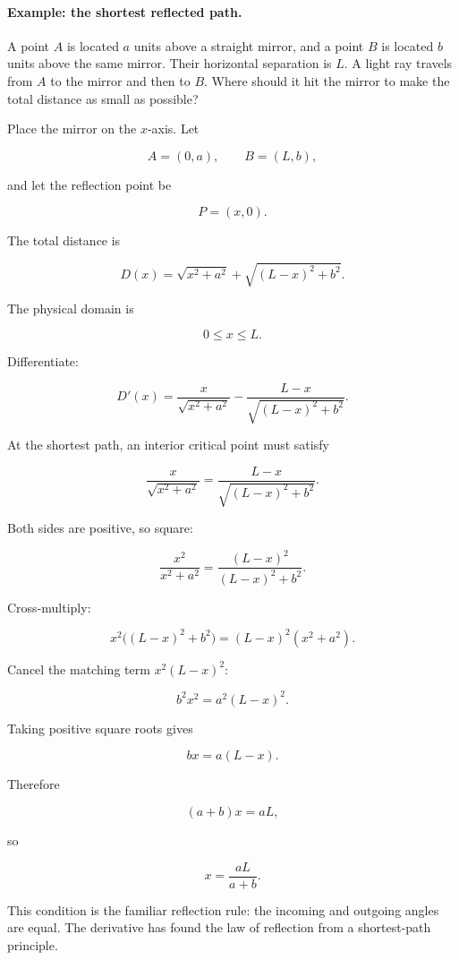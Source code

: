 \paragraph{Example: the shortest reflected path.}
A point \(A\) is located \(a\) units above a straight mirror, and a point \(B\) is located
\(b\) units above the same mirror.  Their horizontal separation is \(L\).  A light ray travels
from \(A\) to the mirror and then to \(B\).  Where should it hit the mirror to make the
total distance as small as possible?

Place the mirror on the \(x\)-axis.  Let

\[
A=(0,a),
\qquad
B=(L,b),
\]

and let the reflection point be

\[
P=(x,0).
\]

The total distance is

\[
D(x)=\sqrt{x^2+a^2}+\sqrt{(L-x)^2+b^2}.
\]

The physical domain is

\[
0\le x\le L.
\]

Differentiate:

\[
D'(x)
=
\frac{x}{\sqrt{x^2+a^2}}
-
\frac{L-x}{\sqrt{(L-x)^2+b^2}}.
\]

At the shortest path, an interior critical point must satisfy

\[
\frac{x}{\sqrt{x^2+a^2}}
=
\frac{L-x}{\sqrt{(L-x)^2+b^2}}.
\]

Both sides are positive, so square:

\[
\frac{x^2}{x^2+a^2}
=
\frac{(L-x)^2}{(L-x)^2+b^2}.
\]

Cross-multiply:

\[
x^2\bigl((L-x)^2+b^2\bigr)
=
(L-x)^2(x^2+a^2).
\]

Cancel the matching term \(x^2(L-x)^2\):

\[
b^2x^2=a^2(L-x)^2.
\]

Taking positive square roots gives

\[
bx=a(L-x).
\]

Therefore

\[
(a+b)x=aL,
\]

so

\[
\boxed{
x=\frac{aL}{a+b}.
}
\]

This condition is the familiar reflection rule: the incoming and outgoing angles are equal.
The derivative has found the law of reflection from a shortest-path principle.

